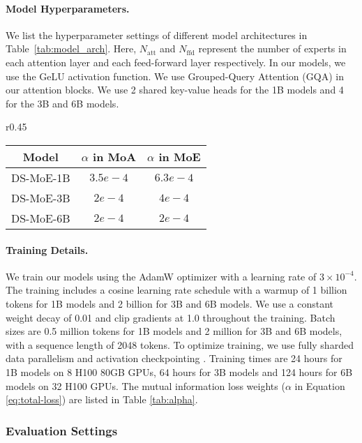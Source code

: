 \paragraph{Model Hyperparameters.} 
We list the hyperparameter settings of different model architectures in Table~\ref{tab:model_arch}. Here, $N_\mathrm{att}$ and $N_\mathrm{ffd}$ represent the number of experts in each attention layer and each feed-forward layer respectively. In our models, we use the GeLU \cite{hendrycks2016gaussian} activation function. We use Grouped-Query Attention (GQA) \cite{ainslie2023gqa} in our attention blocks. We use 2 shared key-value heads for the 1B models and 4 for the 3B and 6B models. 

\begin{wraptable}{r}{0.45\textwidth}
    \centering
    \caption{Value of $\alpha$ in Our Models.}
    \begin{tabular}{c|cc}
        \toprule
        Model  & $\alpha$ in MoA & $\alpha$ in MoE \\
        \midrule
        DS-MoE-1B & $3.5e-4$ & $6.3e-4$ \\
        DS-MoE-3B & $2e-4$ & $4e-4$ \\
        DS-MoE-6B & $2e-4$ & $2e-4$ \\
        \bottomrule
    \end{tabular}
    \label{tab:alpha}
\end{wraptable}\paragraph{Training Details.} We train our models using the AdamW optimizer \cite{loshchilov2017decoupled} with a learning rate of $3 \times 10^{-4}$. The training includes a cosine learning rate schedule with a warmup of 1 billion tokens for 1B models and 2 billion for 3B and 6B models. We use a constant weight decay of 0.01 and clip gradients at 1.0 throughout the training. Batch sizes are 0.5 million tokens for 1B models and 2 million for 3B and 6B models, with a sequence length of 2048 tokens. To optimize training, we use fully sharded data parallelism \cite{zhao2023pytorch, rajbhandari2020zero} and activation checkpointing \cite{korthikanti2023reducing}. Training times are 24 hours for 1B models on 8 H100 80GB GPUs, 64 hours for 3B models and 124 hours for 6B models on 32 H100 GPUs. The mutual information loss weights ($\alpha$ in Equation \ref{eq:total-loss}) are listed in Table \ref{tab:alpha}.  

\subsubsection{Evaluation Settings}
